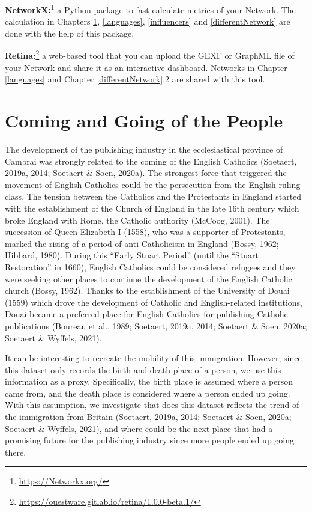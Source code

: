 \documentclass[12pt,a4paper,oneside]{book}
\begin{document}
\begin{sloppypar}
\textbf{NetworkX:}\footnote{\url{https://Networkx.org/}} a Python package to fast calculate metrics of your Network. The calculation in Chapters \ref{comeAndGo}, \ref{languages}, \ref{influencers} and \ref{differentNetwork} are done with the help of this package.

\textbf{Retina:}\footnote{\url{https://ouestware.gitlab.io/retina/1.0.0-beta.1/}} a web-based tool that you can upload the GEXF or GraphML file of your Network and share it as an interactive dashboard. Networks in Chapter \ref{languages} and Chapter \ref{differentNetwork}.2 are shared with this tool.

\chapter{Coming and Going of the People}
\label{comeAndGo}
The development of the publishing industry in the ecclesiastical province of Cambrai was strongly related to the coming of the English Catholics (Soetaert, 2019a, 2014; Soetaert \& Soen, 2020a). The strongest force that triggered the movement of English Catholics could be the persecution from the English ruling class. The tension between the Catholics and the Protestants in England started with the establishment of the Church of England in the late 16th century which broke England with Rome, the Catholic authority (McCoog, 2001). The succession of Queen Elizabeth I (1558), who was a supporter of Protestants, marked the rising of a period of anti-Catholicism in England (Bossy, 1962; Hibbard, 1980). During this “Early Stuart Period” (until the “Stuart Restoration” in 1660), English Catholics could be considered refugees and they were seeking other places to continue the development of the English Catholic church (Bossy, 1962). Thanks to the establishment of the University of Douai (1559) which drove the development of Catholic and English-related institutions, Douai became a preferred place for English Catholics for publishing Catholic publications (Boureau et al., 1989; Soetaert, 2019a, 2014; Soetaert \& Soen, 2020a; Soetaert \& Wyffels, 2021).

It can be interesting to recreate the mobility of this immigration. However, since this dataset only records the birth and death place of a person, we use this information as a proxy. Specifically, the birth place is assumed where a person came from, and the death place is considered where a person ended up going. With this assumption, we investigate that does this dataset reflects the trend of the immigration from Britain (Soetaert, 2019a, 2014; Soetaert \& Soen, 2020a; Soetaert \& Wyffels, 2021), and where could be the next place that had a promising future for the publishing industry since more people ended up going there.


\end{sloppypar}
\end{document}
